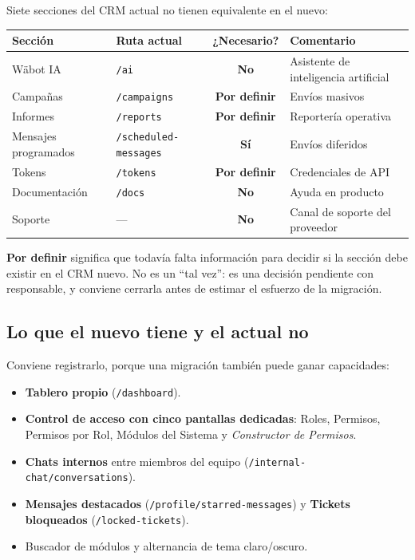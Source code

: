 \documentclass[11pt,a4paper]{article}
\newcommand{\cod}[1]{\texttt{\small #1}}
\newcommand{\si}{\textcolor{ok}{\textbf{Sí}}}
\newcommand{\no}{\textcolor{warn}{\textbf{No}}}
\newcommand{\pordef}{\textcolor{gray70}{\textbf{Por definir}}}
\begin{document}
Siete secciones del CRM actual no tienen equivalente en el nuevo:

\begin{center}
\begin{tabularx}{\textwidth}{@{}llcL@{}}
\toprule
\textbf{Sección} & \textbf{Ruta actual} & \textbf{¿Necesario?} & \textbf{Comentario} \\
\midrule
Wäbot IA            & \cod{/ai}                  & \no      & Asistente de inteligencia artificial \\
Campañas            & \cod{/campaigns}           & \pordef  & Envíos masivos \\
Informes            & \cod{/reports}             & \pordef  & Reportería operativa \\
Mensajes programados& \cod{/scheduled-messages}  & \si      & Envíos diferidos \\
Tokens              & \cod{/tokens}              & \pordef  & Credenciales de API \\
Documentación       & \cod{/docs}                & \no      & Ayuda en producto \\
Soporte             & ---                        & \no      & Canal de soporte del proveedor \\
\bottomrule
\end{tabularx}
\end{center}

\noindent\small\textcolor{gray70}{\textbf{Por definir} significa que todavía falta
información para decidir si la sección debe existir en el CRM nuevo. No es un ``tal
vez'': es una decisión pendiente con responsable, y conviene cerrarla antes de estimar
el esfuerzo de la migración.}
\normalsize

\subsection{Lo que el nuevo tiene y el actual no}

Conviene registrarlo, porque una migración también puede ganar capacidades:

\begin{itemize}
  \item \textbf{Tablero propio} (\cod{/dashboard}).
  \item \textbf{Control de acceso con cinco pantallas dedicadas}: Roles, Permisos,
        Permisos por Rol, Módulos del Sistema y \emph{Constructor de Permisos}.
  \item \textbf{Chats internos} entre miembros del equipo
        (\cod{/internal-chat/conversations}).
  \item \textbf{Mensajes destacados} (\cod{/profile/starred-messages}) y
        \textbf{Tickets bloqueados} (\cod{/locked-tickets}).
  \item Buscador de módulos y alternancia de tema claro/oscuro.
\end{itemize}
\end{document}
